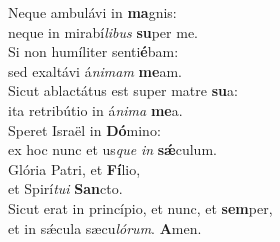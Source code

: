 \evenverse Neque ambulávi in \textbf{ma}gnis:~\*\\
\evenverse neque in mirabí\textit{li}\textit{bus} \textbf{su}per me.\\
\oddverse Si non humíliter senti\textbf{é}bam:~\*\\
\oddverse sed exaltávi á\textit{ni}\textit{mam} \textbf{me}am.\\
\evenverse Sicut ablactátus est super matre \textbf{su}a:~\*\\
\evenverse ita retribútio in á\textit{ni}\textit{ma} \textbf{me}a.\\
\oddverse Speret Israël in \textbf{Dó}mino:~\*\\
\oddverse ex hoc nunc et us\textit{que} \textit{in} \textbf{sǽ}culum.\\
\evenverse Glória Patri, et \textbf{Fí}lio,~\*\\
\evenverse et Spirí\textit{tu}\textit{i} \textbf{San}cto.\\
\oddverse Sicut erat in princípio, et nunc, et \textbf{sem}per,~\*\\
\oddverse et in sǽcula sæcu\textit{ló}\textit{rum}. \textbf{A}men.\\
